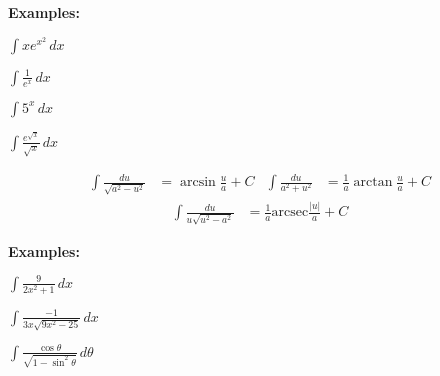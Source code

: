 \noindent\textbf{Examples:}
\begin{questions}
    \begin{minipage}{0.45\linewidth}
        \question $\displaystyle\int x e^{x^2}\,dx$
    \end{minipage}
    \hfill
    \begin{minipage}{0.45\linewidth}
        \question $\displaystyle\int\frac{1}{e^x}\,dx$
    \end{minipage}
    
    
    \begin{minipage}{0.45\linewidth}
        \question $\displaystyle\int5^x\,dx$
    \end{minipage}
    \hfill
    \begin{minipage}{0.45\linewidth}
        \question $\displaystyle\int\frac{e^{\sqrt{x}}}{\sqrt{x}}\,dx$
    \end{minipage}
    
    
\end{questions}


\newpage

\begin{tcolorbox}[title= INTEGRALS OF INVERSE TRIG FUNCTIONS,colframe=black,sharp corners,colback=white,colbacktitle=white,coltitle=black,boxrule=1pt]

    \begin{align*}
        \displaystyle\int\frac{du}{\sqrt{a^2-u^2}} &= \arcsin\frac{u}{a}+C & \displaystyle\int\frac{du}{a^2+u^2} &= \displaystyle\frac{1}{a}\arctan\frac{u}{a}+C 
    \end{align*}
    \begin{align*}
        \displaystyle\int\frac{du}{u\sqrt{u^2-a^2}} &= \frac{1}{a}\text{arcsec}\frac{|u|}{a} +C
    \end{align*}
\end{tcolorbox}
\textbf{Examples:}
\begin{questions}
    \question $\displaystyle\int\frac{9}{2x^2+1}\,dx$
    
    \question $\displaystyle\int\frac{-1}{3x\sqrt{9x^2-25}}\,dx$
    
    
    \question $\displaystyle\int\frac{\cos\theta}{\sqrt{1-\sin^2\theta}}\,d\theta$
\end{questions}


\newpage
